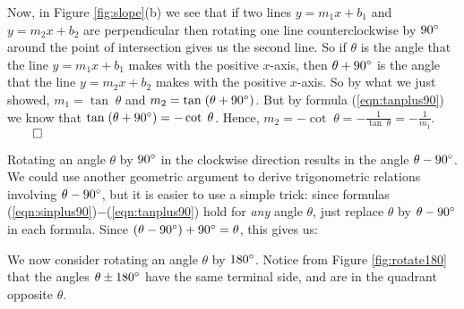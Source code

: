 \begin{exmp}
 \begin{center}\end{center}

Now, in Figure \ref{fig:slope}(b) we see that if two lines $y=m_{1}x+b_1$ and $y=m_{2}x+b_2$ are
perpendicular then rotating one line counterclockwise by $90^\circ$ around the point of
intersection gives us the second line. So if $\theta$ is the angle that the line
$y=m_{1}x+b_1$ makes with the positive $x$-axis, then $\theta + 90^\circ$ is the angle that the
line $y=m_{2}x+b_2$ makes with the positive $x$-axis. So by what we just showed,
$m_1 = \tan\;\theta$ and $m_2 = \tan\;(\theta + 90^\circ)$. But by formula (\ref{eqn:tanplus90})
we know that $\tan\;(\theta + 90^\circ) = -\cot\;\theta$. Hence, $m_2 = -\cot\;\theta =
-\frac{1}{\tan\;\theta} = -\frac{1}{m_1}$. $\qed$
\end{exmp}\vspace{-1mm}
\divider\vspace{-2mm}
\newpage
Rotating an angle $\theta$ by $90^\circ$ in the clockwise direction results in the angle $\theta
- 90^\circ$. We could use another geometric argument to derive trigonometric relations involving
$\theta - 90^\circ$, but it is easier to use a simple trick: since formulas
(\ref{eqn:sinplus90})$-$(\ref{eqn:tanplus90}) hold for \emph{any} angle $\theta$, just replace
$\theta$ by $\theta - 90^\circ$ in each formula. Since $(\theta - 90^\circ) + 90^\circ =
\theta$, this gives us:

\begin{center}\statecomment[0.6\textwidth]{\begin{equation}\label{eqn:sinminus90}
 \sin\;(\theta - 90\Degrees) ~ = ~ -\cos\;\theta
\end{equation}
\begin{equation}\label{eqn:cosminus90}
 \cos\;(\theta - 90\Degrees) ~ = ~ \sin\;\theta\phantom{-}
\end{equation}
\begin{equation}\label{eqn:tanminus90}
 \tan\;(\theta - 90\Degrees) ~ = ~ -\cot\;\theta
\end{equation}}\end{center}

We now consider rotating an angle $\theta$ by $180^\circ$. Notice from Figure \ref{fig:rotate180}
that the angles $\theta \pm 180^\circ$ have the same terminal side, and are in the
quadrant opposite $\theta$.

